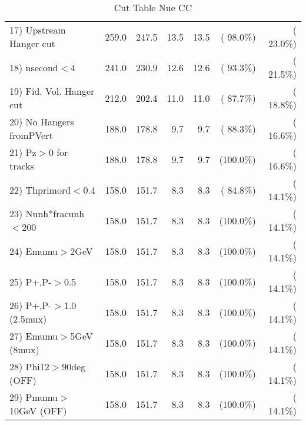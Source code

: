 \begin{table}[h!]
\begin{tabular}{||l||r|r|r|r|r|r||}
 17) Upstream Hanger cut  &        259.0 &        247.5 &         13.5 &         13.5 & ( 98.0\%) & ( 23.0\%) \\
 18) nsecond$<$4          &        241.0 &        230.9 &         12.6 &         12.6 & ( 93.3\%) & ( 21.5\%) \\
 19) Fid. Vol. Hanger cut &        212.0 &        202.4 &         11.0 &         11.0 & ( 87.7\%) & ( 18.8\%) \\
 20) No Hangers fromPVert &        188.0 &        178.8 &          9.7 &          9.7 & ( 88.3\%) & ( 16.6\%) \\
 21) Pz$>$0 for tracks    &        188.0 &        178.8 &          9.7 &          9.7 & (100.0\%) & ( 16.6\%) \\
 22) Thprimord$<$0.4      &        158.0 &        151.7 &          8.3 &          8.3 & ( 84.8\%) & ( 14.1\%) \\
 23) Nunh*fracunh$<$200   &        158.0 &        151.7 &          8.3 &          8.3 & (100.0\%) & ( 14.1\%) \\
 24) Emumu$>$2GeV         &        158.0 &        151.7 &          8.3 &          8.3 & (100.0\%) & ( 14.1\%) \\
 25) P+,P-$>$0.5          &        158.0 &        151.7 &          8.3 &          8.3 & (100.0\%) & ( 14.1\%) \\
 26) P+,P-$>$1.0 (2.5mux) &        158.0 &        151.7 &          8.3 &          8.3 & (100.0\%) & ( 14.1\%) \\
 27) Emumu$>$5GeV  (8mux) &        158.0 &        151.7 &          8.3 &          8.3 & (100.0\%) & ( 14.1\%) \\
 28) Phi12$>$90deg  (OFF) &        158.0 &        151.7 &          8.3 &          8.3 & (100.0\%) & ( 14.1\%) \\
 29) Pmumu$>$10GeV  (OFF) &        158.0 &        151.7 &          8.3 &          8.3 & (100.0\%) & ( 14.1\%) \\
 \hline
 \hline
 \end{tabular}
 \caption{Cut Table   Nue CC  }
 \label{tab-cutcohjpsi-mumu_nuecc}
 \end{table}
